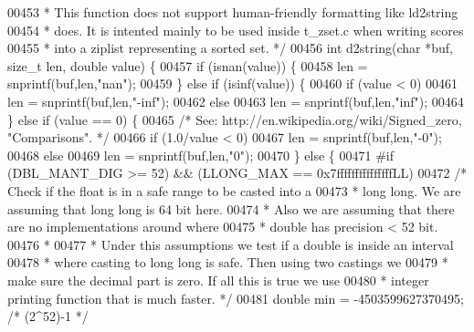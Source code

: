 \begin{DoxyCode}
00453 \textcolor{comment}{ * This function does not support human-friendly formatting like ld2string}
00454 \textcolor{comment}{ * does. It is intented mainly to be used inside t\_zset.c when writing scores}
00455 \textcolor{comment}{ * into a ziplist representing a sorted set. */}
00456 \textcolor{keywordtype}{int} d2string(\textcolor{keywordtype}{char} *buf, size\_t len, \textcolor{keywordtype}{double} value) \{
00457     \textcolor{keywordflow}{if} (isnan(value)) \{
00458         len = snprintf(buf,len,\textcolor{stringliteral}{"nan"});
00459     \} \textcolor{keywordflow}{else} \textcolor{keywordflow}{if} (isinf(value)) \{
00460         \textcolor{keywordflow}{if} (value < 0)
00461             len = snprintf(buf,len,\textcolor{stringliteral}{"-inf"});
00462         \textcolor{keywordflow}{else}
00463             len = snprintf(buf,len,\textcolor{stringliteral}{"inf"});
00464     \} \textcolor{keywordflow}{else} \textcolor{keywordflow}{if} (value == 0) \{
00465         \textcolor{comment}{/* See: http://en.wikipedia.org/wiki/Signed\_zero, "Comparisons". */}
00466         \textcolor{keywordflow}{if} (1.0/value < 0)
00467             len = snprintf(buf,len,\textcolor{stringliteral}{"-0"});
00468         \textcolor{keywordflow}{else}
00469             len = snprintf(buf,len,\textcolor{stringliteral}{"0"});
00470     \} \textcolor{keywordflow}{else} \{
00471 \textcolor{preprocessor}{#}\textcolor{preprocessor}{if} \textcolor{preprocessor}{(}\textcolor{preprocessor}{DBL\_MANT\_DIG} \textcolor{preprocessor}{>=} 52\textcolor{preprocessor}{)} \textcolor{preprocessor}{&&} \textcolor{preprocessor}{(}LLONG\_MAX \textcolor{preprocessor}{==} 0x7fffffffffffffffLL\textcolor{preprocessor}{)}
00472         \textcolor{comment}{/* Check if the float is in a safe range to be casted into a}
00473 \textcolor{comment}{         * long long. We are assuming that long long is 64 bit here.}
00474 \textcolor{comment}{         * Also we are assuming that there are no implementations around where}
00475 \textcolor{comment}{         * double has precision < 52 bit.}
00476 \textcolor{comment}{         *}
00477 \textcolor{comment}{         * Under this assumptions we test if a double is inside an interval}
00478 \textcolor{comment}{         * where casting to long long is safe. Then using two castings we}
00479 \textcolor{comment}{         * make sure the decimal part is zero. If all this is true we use}
00480 \textcolor{comment}{         * integer printing function that is much faster. */}
00481         \textcolor{keywordtype}{double} min = -4503599627370495; \textcolor{comment}{/* (2^52)-1 */}

\end{DoxyCode}
